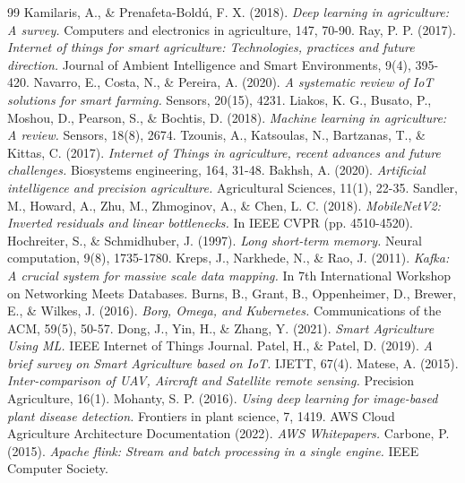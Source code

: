 \documentclass[12pt, a4paper]{report}
\begin{document}
\begin{thebibliography}{99}
 Kamilaris, A., \& Prenafeta-Boldú, F. X. (2018). \textit{Deep learning in agriculture: A survey.} Computers and electronics in agriculture, 147, 70-90.
 Ray, P. P. (2017). \textit{Internet of things for smart agriculture: Technologies, practices and future direction.} Journal of Ambient Intelligence and Smart Environments, 9(4), 395-420.
 Navarro, E., Costa, N., \& Pereira, A. (2020). \textit{A systematic review of IoT solutions for smart farming.} Sensors, 20(15), 4231.
 Liakos, K. G., Busato, P., Moshou, D., Pearson, S., \& Bochtis, D. (2018). \textit{Machine learning in agriculture: A review.} Sensors, 18(8), 2674.
 Tzounis, A., Katsoulas, N., Bartzanas, T., \& Kittas, C. (2017). \textit{Internet of Things in agriculture, recent advances and future challenges.} Biosystems engineering, 164, 31-48.
 Bakhsh, A. (2020). \textit{Artificial intelligence and precision agriculture.} Agricultural Sciences, 11(1), 22-35.
 Sandler, M., Howard, A., Zhu, M., Zhmoginov, A., \& Chen, L. C. (2018). \textit{MobileNetV2: Inverted residuals and linear bottlenecks.} In IEEE CVPR (pp. 4510-4520).
 Hochreiter, S., \& Schmidhuber, J. (1997). \textit{Long short-term memory.} Neural computation, 9(8), 1735-1780.
 Kreps, J., Narkhede, N., \& Rao, J. (2011). \textit{Kafka: A crucial system for massive scale data mapping.} In 7th International Workshop on Networking Meets Databases.
 Burns, B., Grant, B., Oppenheimer, D., Brewer, E., \& Wilkes, J. (2016). \textit{Borg, Omega, and Kubernetes.} Communications of the ACM, 59(5), 50-57.
 Dong, J., Yin, H., \& Zhang, Y. (2021). \textit{Smart Agriculture Using ML.} IEEE Internet of Things Journal.
 Patel, H., \& Patel, D. (2019). \textit{A brief survey on Smart Agriculture based on IoT.} IJETT, 67(4).
 Matese, A. (2015). \textit{Inter-comparison of UAV, Aircraft and Satellite remote sensing.} Precision Agriculture, 16(1).
 Mohanty, S. P. (2016). \textit{Using deep learning for image-based plant disease detection.} Frontiers in plant science, 7, 1419.
 AWS Cloud Agriculture Architecture Documentation (2022). \textit{AWS Whitepapers.}
 Carbone, P. (2015). \textit{Apache flink: Stream and batch processing in a single engine.} IEEE Computer Society.

\end{thebibliography}
\end{document}
